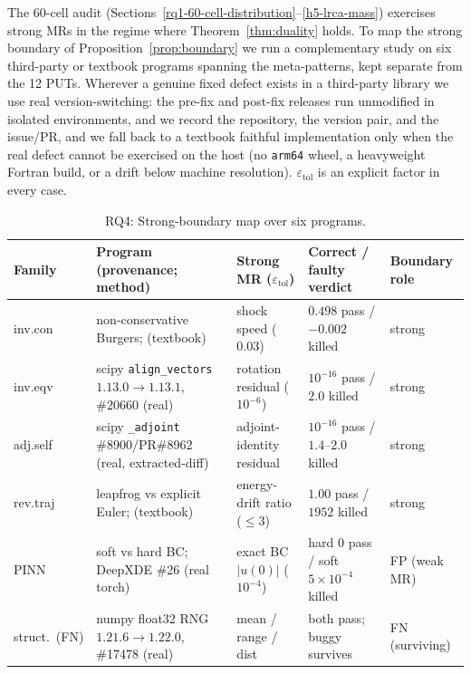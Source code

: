\documentclass[manuscript,screen,review]{acmart}
\begin{document}
The 60-cell audit (Sections~\ref{rq1-60-cell-distribution}--\ref{h5-lrca-mass}) exercises strong MRs in the regime where
Theorem~\ref{thm:duality} holds. To map the strong boundary of Proposition~\ref{prop:boundary} we run a
complementary study on six third-party or textbook programs spanning the
meta-patterns, kept separate from the 12 PUTs. Wherever a genuine fixed
defect exists in a third-party library we use real version-switching:
the pre-fix and post-fix releases run unmodified in isolated environments,
and we record the repository, the version pair, and the issue/PR, and
we fall back to a textbook faithful implementation only when the real
defect cannot be exercised on the host (no \texttt{arm64} wheel, a
heavyweight Fortran build, or a drift below machine resolution).
$\varepsilon_{\mathrm{tol}}$ is an explicit factor in every case.

{%
\begin{longtable}[]{@{}p{1.6cm}p{3.4cm}p{2.5cm}p{2.6cm}p{1.7cm}@{}}
\caption{RQ4: Strong-boundary map over six programs.}\label{tab:p2-30}\\
\toprule\noalign{}
Family & Program (provenance; method) & Strong MR ($\varepsilon_{\mathrm{tol}}$) & Correct / faulty verdict & Boundary role \\
\midrule\noalign{}
\endfirsthead
\endhead
\bottomrule\noalign{}
\endlastfoot
inv.con & non-conservative Burgers; \citep{hou1994nonconservative} (textbook) & shock speed ($0.03$) & $0.498$ pass / $-0.002$ killed & strong \\
inv.eqv & scipy \texttt{align\_vectors} $1.13.0\to1.13.1$, \#20660 (real) & rotation residual ($10^{-6}$) & $10^{-16}$ pass / $2.0$ killed & strong \\
adj.self & scipy \texttt{\_adjoint} \#8900/PR\#8962 (real, extracted-diff) & adjoint-identity residual & $10^{-16}$ pass / $1.4$--$2.0$ killed & strong \\
rev.traj & leapfrog vs explicit Euler; \citep{hairer2006geometric} (textbook) & energy-drift ratio ($\leq 3$) & $1.00$ pass / $1952$ killed & strong \\
PINN & soft vs hard BC; DeepXDE \#26 (real torch) & exact BC $|u(0)|$ ($10^{-4}$) & hard $0$ pass / soft $5\times10^{-4}$ killed & FP (weak MR) \\
struct.\ (FN) & numpy float32 RNG $1.21.6\to1.22.0$, \#17478 (real) & mean / range / dist & both pass; buggy survives & FN (surviving) \\
\end{longtable}
}
\end{document}
